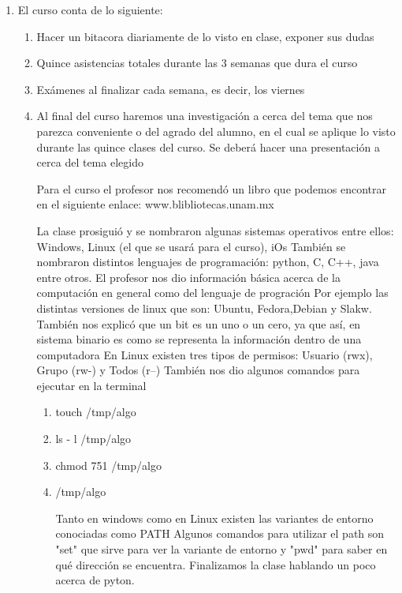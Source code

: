\documentclass{book}
\begin{document}
\begin{enumerate}
	\item  El curso conta de lo siguiente:
	\begin{enumerate}
		\item Hacer un bitacora diariamente de lo visto en clase, exponer sus dudas
		\item Quince asistencias totales durante las 3 semanas que dura el curso
		\item Exámenes al finalizar cada semana, es decir, los viernes
		\item Al final del curso haremos una investigación a cerca del tema que nos parezca conveniente o del agrado del alumno, en el cual se aplique lo visto durante las quince clases del curso. Se deberá hacer una presentación a cerca del tema elegido
		
		Para el curso el profesor nos recomendó un libro que podemos encontrar en el siguiente enlace: www.blibliotecas.unam.mx 
		
		La clase prosiguió y se nombraron algunas sistemas operativos entre ellos: Windows, Linux (el que se usará para el curso), iOs
		También se nombraron distintos lenguajes de programación: python, C, C++, java entre otros.
		El profesor nos dio información básica acerca de la computación en general como del lenguaje de progración
		Por ejemplo las distintas versiones de linux que son: Ubuntu, Fedora,Debian y Slakw.
		También nos explicó que un bit es un uno o un cero, ya que así, en sistema binario es como se representa la información dentro de una computadora
		En Linux existen tres tipos de permisos: Usuario (rwx), Grupo (rw-) y Todos (r--)
		También nos dio algunos comandos para ejecutar en la terminal
		\begin{enumerate}
			\item touch /tmp/algo
			\item ls - l /tmp/algo
			\item chmod 751 /tmp/algo
			\item /tmp/algo
			
			Tanto en windows como en Linux existen las variantes de entorno conociadas como PATH
			Algunos comandos para utilizar el path son "set" que sirve para ver la variante de entorno y "pwd" para saber en qué dirección se encuentra. 
			Finalizamos la clase hablando un poco acerca de pyton.
		\end{enumerate}
	\end{enumerate}
\end{enumerate}	
\end{document}
